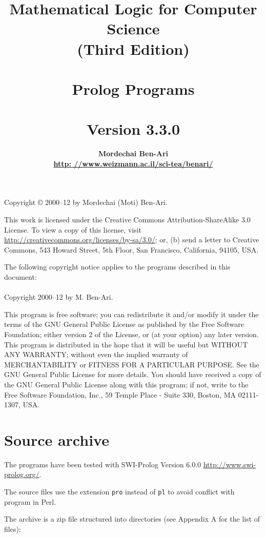 \documentclass[11pt]{article}
\author{\bfseries Mordechai Ben-Ari\\\url{http: //www.weizmann.ac.il/sci-tea/benari/}}
\title{\bfseries Mathematical Logic for Computer Science\\
\bfseries\large (Third Edition)\\\mbox{}\\
\bfseries\Large Prolog Programs\\\mbox{}\\
\bfseries\normalsize Version 3.3.0}
\newcommand*{\p}[1]{\textup{\texttt{#1}}}
\begin{document}
\maketitle
\thispagestyle{empty}

\bigskip

\begin{center}
Copyright \copyright{} 2000--12 by Mordechai (Moti) Ben-Ari.
\end{center}
This work is licensed under the Creative Commons Attribution-ShareAlike 3.0
License. To view a copy of this license, visit
\url{http://creativecommons.org/licenses/by-sa/3.0/}; or, (b) send a letter
to Creative Commons, 543 Howard Street, 5th Floor, San Francisco,
California, 94105, USA.

\vfill
 
\begin{center}
The following copyright notice applies to the programs described in this
document:\mbox{}\\\mbox{}\\
Copyright 2000--12 by M. Ben-Ari.
\end{center}

This program is free software; you can redistribute it and/or
modify it under the terms of the GNU General Public License
as published by the Free Software Foundation; either version 2
of the License, or (at your option) any later version.
This program is distributed in the hope that it will be useful
but WITHOUT ANY WARRANTY; without even the implied warranty of
MERCHANTABILITY or FITNESS FOR A PARTICULAR PURPOSE.
See the GNU General Public License for more details.
You should have received a copy of the GNU General Public License
along with this program; if not, write to the Free Software
Foundation, Inc., 59 Temple Place - Suite 330, Boston, MA
02111-1307, USA.

\newpage



\section{Source archive}\label{s.archive}

The programs have been tested with SWI-Prolog Version 6.0.0
\url{http://www.swi-prolog.org/}.

The source files use the extension \p{pro} instead of
\p{pl} to avoid conflict with program in Perl.

The archive is a zip file structured into directories (see Appendix A
for the list of files):
\end{document}
